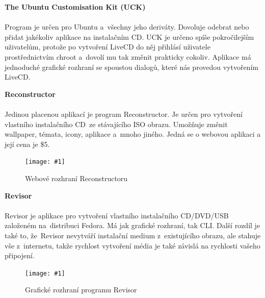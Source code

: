 \documentclass[a4paper,12pt]{article}
\newcommand{\nadpis}[1]{%
	\vspace{4 mm}
	\textbf{#1}\\
	\vspace{4 mm}
	}
\newcommand{\obr}[3]{%
	\begin{figure}[h]
	\center\texttt{[image: \#1]}
	\caption{#3}
	\end{figure}
	}
\begin{document}
\nadpis{The Ubuntu Customisation Kit (UCK)}\\ \label{sec:UCK}
Program je určen pro Ubuntu a~všechny jeho deriváty. Dovoluje odebrat nebo přidat jakékoliv aplikace na instalačním CD. UCK je určeno spíše pokročilejším uživatelům, protože po vytvoření LiveCD do něj přihlásí uživatele prostřednictvím chroot a~dovolí mu tak změnit prakticky cokoliv. Aplikace má jednoduché grafické rozhraní se spoustou dialogů, které nás provedou vytvořením LiveCD.\cite{Linux_Build}


\nadpis{Reconstructor}\\
Jedinou placenou aplikací je program Reconstructor. Je určen pro vytvoření vlastního instalačního CD ze stávajícího ISO obrazu. Umožňuje změnit wallpaper, témata, icony, aplikace a~mnoho jiného.
Jedná se o webovou aplikaci a její cena je \$5.\cite{Linux_Build}
\begin{center}
\obr{./img/screens/reconstructor.jpg}{0.5}{Webové rozhraní Reconstructoru}
\end{center}

\newpage
\nadpis{Revisor}\\
Revisor je aplikace pro vytvoření vlastního instalačního CD/DVD/USB založeném na~distribuci Fedora. Má jak grafické rozhraní, tak CLI. Další rozdíl je také to, že~Revisor nevytváří instalační medium z~existujícího obrazu, ale stahuje vše z~internetu, takže rychlost vytvoření média je také závislá na rychlosti vašeho připojení.\cite{Linux_Build}
\begin{center}
\obr{./img/screens/revisor.jpg}{0.7}{Grafické rozhraní programu Revisor}
\end{center}

\end{document}
